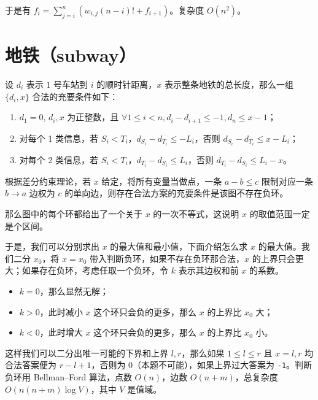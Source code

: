 \documentclass[11pt,a4paper,oneside]{article}
\begin{document}
于是有 $f_i=\sum_{j=i}^n (w_{i,j}(n-i)!+f_{i+1})$。复杂度 $O(n^2)$。

\section{地铁（subway）}

设 $d_i$ 表示 $1$ 号车站到 $i$ 的顺时针距离，$x$ 表示整条地铁的总长度，那么一组 $\{d_i,x\}$ 合法的充要条件如下：

\begin{enumerate}
  \item $d_1=0$, $d_i,x$ 为正整数，且 $\forall 1 \le i < n,d_{i}-d_{i+1} \le -1,d_n \le x-1$；
  \item 对每个 1 类信息，若 $S_i < T_i$，$d_{S_i}-d_{T_i} \le -L_i$，否则 $d_{S_i}-d_{T_i} \le x-L_i$；
  \item 对每个 2 类信息，若 $S_i < T_i$，$d_{T_i}-d_{S_i} \le L_i$，否则 $d_{T_i}-d_{S_i} \le L_i-x$。
\end{enumerate}

根据差分约束理论，若 $x$ 给定，将所有变量当做点，一条 $a-b \le c$ 限制对应一条 $b \to a$ 边权为 $c$ 的单向边，则存在合法方案的充要条件是该图不存在负环。

那么图中的每个环都给出了一个关于 $x$ 的一次不等式，这说明 $x$ 的取值范围一定是个区间。

于是，我们可以分别求出 $x$ 的最大值和最小值，下面介绍怎么求 $x$ 的最大值。我们二分 $x_0$，将 $x=x_0$ 带入判断负环，如果不存在负环那合法，$x$ 的上界只会更大；如果存在负环，考虑任取一个负环，令 $k$ 表示其边权和前 $x$ 的系数。

\begin{itemize}
  \item $k=0$，那么显然无解；
  \item $k>0$，此时减小 $x$ 这个环只会负的更多，那么 $x$ 的上界比 $x_0$ 大；
  \item $k<0$，此时增大 $x$ 这个环只会负的更多，那么 $x$ 的上界比 $x_0$ 小。
\end{itemize}

这样我们可以二分出唯一可能的下界和上界 $l,r$，那么如果 $1 \le l \le r$ 且 $x=l,r$ 均合法答案便为 $r-l+1$，否则为 $0$（本题不可能），如果上界过大答案为 \texttt{-1}。判断负环用 Bellman–Ford 算法，点数 $O(n)$，边数 $O(n+m)$，总复杂度 $O(n(n+m) \log V)$，其中 $V$ 是值域。
\end{document}
